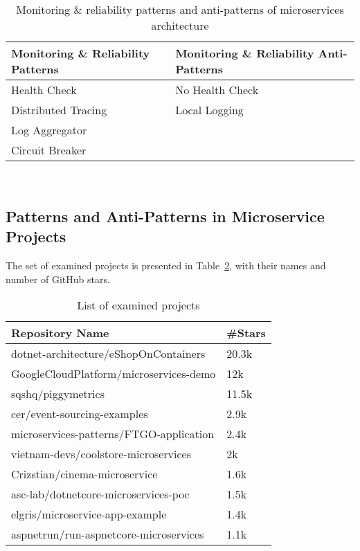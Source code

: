 \documentclass[11pt,a4paper,twocolumn]{article}
\begin{document}
\begin{table}[H]
\centering 
    \begin{tabular}{ 
  | >{\centering\arraybackslash} m{9em} 
  | >{\centering\arraybackslash} m{9em} | }
    \hline
    \rowcolor{bluepoli!40}
    \textbf{Monitoring \& Reliability Patterns} & \textbf{Monitoring \& Reliability Anti-Patterns}\T\B \\
    \hline \hline
    Health Check & No Health Check\T\B\\
    \hline
    \rowcolor{bluepoli!10}
    Distributed Tracing & Local Logging\T\B\\
    \hline
    Log Aggregator & \T\B\\
    \hline
    \rowcolor{bluepoli!10}
    Circuit Breaker & \T\B\\
    \hline
    \end{tabular}
    \\[10pt]
    \caption{Monitoring \& reliability patterns and anti-patterns of microservices architecture}
    \label{table:pattern_table_3}
\end{table}

\subsection{Patterns and Anti-Patterns in Microservice Projects}
\label{subsec:rq2}

The set of examined projects is presented in Table~\ref{table:project_list}, with their names and number of GitHub stars.
\begin{table}[H]
\centering 
    \begin{tabular}{ 
  | >{\centering\arraybackslash} m{15.3em} 
  | >{\centering\arraybackslash} m{3.5em} | }
    \hline
    \rowcolor{bluepoli!40}
    \textbf{Repository Name} & \textbf{\#Stars}\T\B \\
    \hline \hline
    dotnet-architecture/eShopOnContainers & 20.3k\T\B\\
    \hline
    \rowcolor{bluepoli!10}
    GoogleCloudPlatform/microservices-demo & 12k\T\B\\
    \hline
    sqshq/piggymetrics & 11.5k\T\B\\
    \hline
    \rowcolor{bluepoli!10}
    cer/event-sourcing-examples & 2.9k\T\B\\
    \hline
    microservices-patterns/FTGO-application & 2.4k\T\B\\
    \hline
    \rowcolor{bluepoli!10}
    vietnam-devs/coolstore-microservices & 2k\T\B\\
    \hline
    Crizstian/cinema-microservice & 1.6k\T\B\\
    \hline
    \rowcolor{bluepoli!10}
    asc-lab/dotnetcore-microservices-poc & 1.5k\T\B\\
    \hline
    elgris/microservice-app-example & 1.4k\T\B\\
    \hline
    \rowcolor{bluepoli!10}
    aspnetrun/run-aspnetcore-microservices & 1.1k\T\B\\
    \hline
    \end{tabular}
    \\[10pt]
    \caption{List of examined projects}
    \label{table:project_list}
\end{table}
\end{document}
